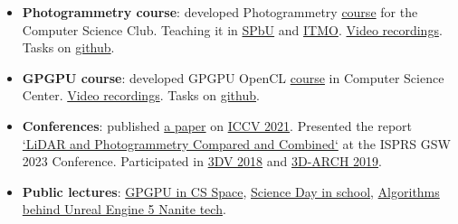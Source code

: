\documentclass[11pt,oneside]{article}
\newcommand{\hhref}[2]{\href{#1}{\color{blue}#2}}
\begin{document}
\begin{itemize}
    \item{\textbf{Photogrammetry course}}: developed Photogrammetry  \hhref{https://compsciclub.ru/courses/photogrammetry/2021-spring/}{course} for the Computer Science Club. Teaching it in \hhref{https://math-cs.spbu.ru/}{SPbU} and \hhref{https://ct.itmo.ru/}{ITMO}.  \hhref{https://www.youtube.com/watch?v=rEF0zkv2cn8&list=PL5p-5hHpsHBp4yTpeZJ_QMSmJPAuov-VF&index=1}{Video recordings}. Tasks on \hhref{https://github.com/PhotogrammetryCourse/}{github}.
    \item{\textbf{GPGPU course}}: developed GPGPU OpenCL \hhref{https://compscicenter.ru/courses/video_cards_computation/}{course} in Computer Science Center. \hhref{https://www.youtube.com/watch?v=LDt4KQEdImY&list=PLlb7e2G7aSpSkDWlyJQzT9Qx9rrgKSgAp&index=1}{Video recordings}. Tasks on \hhref{https://github.com/GPGPUCourse/}{github}.
    \item{\textbf{Conferences}}: published \hhref{https://www.polarnick.com/static/papers/poliarnyi2021.pdf}{a paper} on \hhref{http://iccv2021.thecvf.com/}{ICCV 2021}. Presented the report \hhref{https://polarnick.com/static/presentations/AgisoftMetashapeGSW2023.pdf}{‘LiDAR and Photogrammetry Compared and Combined‘} at the ISPRS GSW 2023 Conference. Participated in \hhref{http://3dv18.uniud.it/}{3DV 2018} and \hhref{http://www.3d-arch.org/}{3D-ARCH 2019}.
    \item{\textbf{Public lectures}}: \hhref{https://csspace.io/open-lecture/2025-gpu}{GPGPU in CS Space}, \hhref{https://www.youtube.com/watch?v=adQQoH3iXPQ}{Science Day in school}, \hhref{https://www.youtube.com/watch?v=ltUzX1IR9JI&list=PL5p-5hHpsHBolSeDn7__1c9hgPprYTjnn&index=3}{Algorithms behind Unreal Engine 5 Nanite tech}.


\end{itemize}
\end{document}

